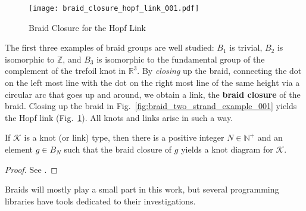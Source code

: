         \begin{figure}
            \centering
            \texttt{[image: braid\_closure\_hopf\_link\_001.pdf]}
            \caption{Braid Closure for the Hopf Link}
            \label{fig:braid_closure_hopf_link_001}
        \end{figure}
        The first three examples of braid groups are well studied:
        $B_{1}$ is trivial, $B_{2}$ is isomorphic to $\mathbb{Z}$, and
        $B_{3}$ is isomorphic to the fundamental group of the complement of
        the trefoil knot in $\mathbb{R}^{3}$. By \textit{closing} up the
        braid, connecting the dot on the left most line with the dot on the
        right most line of the same height via a circular arc that goes up and
        around, we obtain a link, the \textbf{braid closure} of the braid.
        Closing up the braid in Fig.~\ref{fig:braid_two_strand_example_001}
        yields the Hopf link (Fig.~\ref{fig:braid_closure_hopf_link_001}).
        All knots and links arise in such a way.
        \begin{theorem}
            If $\mathcal{K}$ is a knot (or link) type, then there is a
            positive integer $N\in\mathbb{N}^{+}$ and an element
            $g\in{B}_{N}$ such that the braid closure of $g$ yields a
            knot diagram for $\mathcal{K}$.
        \end{theorem}
        \begin{proof}
            See \cite{AlexandersTheorem1923}.
        \end{proof}
        Braids will mostly play a small part in this work, but
        several programming libraries have tools dedicated to their
        investigations.
